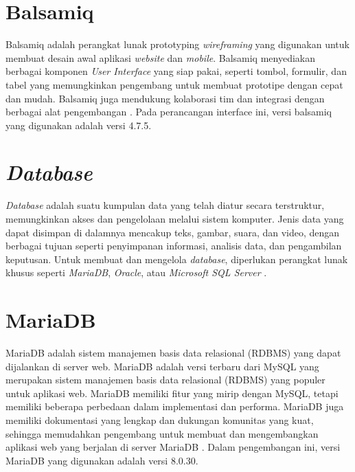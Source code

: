 \section{Balsamiq}
Balsamiq adalah perangkat lunak prototyping \textit{wireframing} yang digunakan untuk membuat desain awal aplikasi \textit{website} dan \emph{mobile}. Balsamiq menyediakan berbagai komponen \textit{User Interface} yang siap pakai, seperti tombol, formulir, dan tabel yang memungkinkan pengembang untuk membuat prototipe dengan cepat dan mudah. Balsamiq juga mendukung kolaborasi tim dan integrasi dengan berbagai alat pengembangan \cite{balsamiq}. Pada perancangan interface ini, versi balsamiq yang digunakan adalah versi 4.7.5.

\section{\textit{Database}}
\textit{Database} adalah suatu kumpulan data yang telah diatur secara terstruktur, memungkinkan akses dan pengelolaan melalui sistem komputer. Jenis data yang dapat disimpan di dalamnya mencakup teks, gambar, suara, dan video, dengan berbagai tujuan seperti penyimpanan informasi, analisis data, dan pengambilan keputusan. Untuk membuat dan mengelola \textit{database}, diperlukan perangkat lunak khusus seperti \textit{MariaDB}, \textit{Oracle}, atau \textit{Microsoft SQL Server} \cite{Cowls2021ADB}.

\section{MariaDB}
MariaDB adalah sistem manajemen basis data relasional (RDBMS) yang dapat dijalankan di server web. MariaDB adalah versi terbaru dari MySQL yang merupakan sistem manajemen basis data relasional (RDBMS) yang populer untuk aplikasi web. MariaDB memiliki fitur yang mirip dengan MySQL, tetapi memiliki beberapa perbedaan dalam implementasi dan performa. MariaDB juga memiliki dokumentasi yang lengkap dan dukungan komunitas yang kuat, sehingga memudahkan pengembang untuk membuat dan mengembangkan aplikasi web yang berjalan di server MariaDB \cite{mariadb2024}. Dalam pengembangan ini, versi MariaDB yang digunakan adalah versi 8.0.30.


